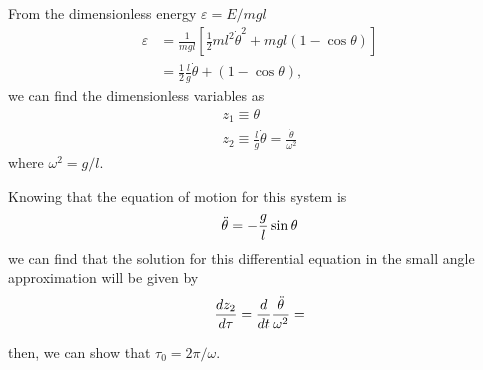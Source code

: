 \subsection{}
From the dimensionless energy $\varepsilon=E/mgl$ 
\begin{align*}
    \varepsilon&=\frac{1}{mgl}\left[\frac{1}{2}ml^2\dot{\theta}^2+mgl(1-\cos\theta)\right]\\
    &=\frac{1}{2}\frac{l}{g}\dot{\theta} + (1-\cos\theta),
\end{align*}
we can find the dimensionless variables as
\begin{align*}
    z_1\equiv\theta\\
    z_2\equiv\frac{l}{g}\dot{\theta}=\frac{\dot{\theta}}{\omega^2}
\end{align*}
where $\omega^2=g/l$.

Knowing that the equation of motion for this system is 
\begin{equation*}
    \Ddot{\theta}=-\frac{g}{l}\sin\theta
    \label{eq:pendEqMotion}
\end{equation*}
we can find that the solution for this differential equation in the small angle approximation will be given by
\begin{equation*}
\frac{dz_2}{d\tau}=\frac{d}{dt}
\frac{\Ddot{\theta}}{\omega^2}=    
\end{equation*}

then, we can show that
$\tau_0=2\pi/\omega$.

\subsection{}

